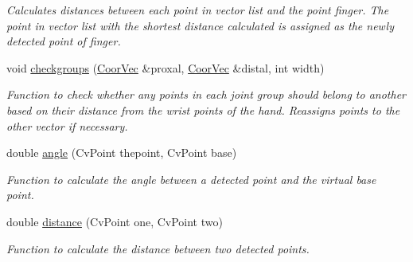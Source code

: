 \begin{DoxyCompactItemize}
\begin{DoxyCompactList}\small\item\em Calculates distances between each point in vector {\itshape list\/} and the point {\itshape finger\/}. The point in vector {\itshape list\/} with the shortest distance calculated is assigned as the newly detected point of {\itshape finger\/}. \end{DoxyCompactList}\item 
void \hyperlink{classFullhand_a1f1fc43f8637324a1e73808f35dff218}{checkgroups} (\hyperlink{blobby_8h_a7017012a1393f7249d0e03d6ac9f1c7b}{CoorVec} \&proxal, \hyperlink{blobby_8h_a7017012a1393f7249d0e03d6ac9f1c7b}{CoorVec} \&distal, int width)
\begin{DoxyCompactList}\small\item\em Function to check whether any points in each joint group should belong to another based on their distance from the wrist points of the hand. Reassigns points to the other vector if necessary. \end{DoxyCompactList}\item 
double \hyperlink{classFullhand_af3d5ae9929b6832b10459152ec1c9300}{angle} (CvPoint thepoint, CvPoint base)
\begin{DoxyCompactList}\small\item\em Function to calculate the angle between a detected point and the virtual base point. \end{DoxyCompactList}\item 
double \hyperlink{classFullhand_a591ffe2a9eab20ec6b52b6ced0c961d3}{distance} (CvPoint one, CvPoint two)
\begin{DoxyCompactList}\small\item\em Function to calculate the distance between two detected points. \end{DoxyCompactList}\end{DoxyCompactItemize}
